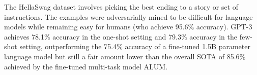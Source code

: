 The HellaSwag dataset \cite{zellers2019hellaswag} involves picking the best ending to a story or set of instructions.  The examples were adversarially mined to be difficult for language models while remaining easy for humans (who achieve 95.6\% accuracy).  GPT-3 achieves 78.1\% accuracy in the one-shot setting and 79.3\% accuracy in the few-shot setting, outperforming the 75.4\% accuracy of a fine-tuned 1.5B parameter language model \cite{zellers2019defending} but still a fair amount lower than the overall SOTA of 85.6\% achieved by the fine-tuned multi-task model ALUM.
